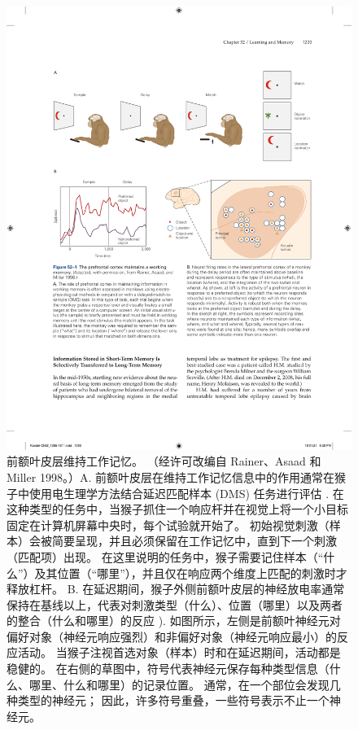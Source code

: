 \begin{figure}[htbp]
	\centering
	\includegraphics[width=0.95\linewidth]{chap52/fig_52_1}
	\caption{前额叶皮层维持工作记忆。 （经许可改编自 Rainer、Asaad 和 Miller 1998。）A. 前额叶皮层在维持工作记忆信息中的作用通常在猴子中使用电生理学方法结合延迟匹配样本 (DMS) 任务进行评估 . 在这种类型的任务中，当猴子抓住一个响应杆并在视觉上将一个小目标固定在计算机屏幕中央时，每个试验就开始了。 初始视觉刺激（样本）会被简要呈现，并且必须保留在工作记忆中，直到下一个刺激（匹配项）出现。 在这里说明的任务中，猴子需要记住样本（“什么”）及其位置（“哪里”），并且仅在响应两个维度上匹配的刺激时才释放杠杆。 B. 在延迟期间，猴子外侧前额叶皮层的神经放电率通常保持在基线以上，代表对刺激类型（什么）、位置（哪里）以及两者的整合（什么和哪里）的反应 ). 如图所示，左侧是前额叶神经元对偏好对象（神经元响应强烈）和非偏好对象（神经元响应最小）的反应活动。 当猴子注视首选对象（样本）时和在延迟期间，活动都是稳健的。 在右侧的草图中，符号代表神经元保存每种类型信息（什么、哪里、什么和哪里）的记录位置。 通常，在一个部位会发现几种类型的神经元； 因此，许多符号重叠，一些符号表示不止一个神经元。}
	\label{fig:52_1}
\end{figure}


